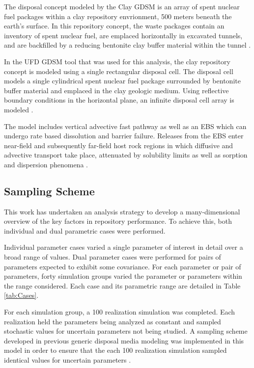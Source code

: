 The disposal concept modeled by the Clay \gls{GDSM} is an array of spent nuclear 
fuel packages within a clay repository envrionment, 500 meters beneath the 
earth's surface. In this repository concept, the waste packages contain an 
inventory of spent nuclear fuel, are emplaced horizontally in excavated tunnels, 
and are backfilled by a reducing bentonite clay buffer material within the 
tunnel \cite{nutt_generic_2009}. 

In the \gls{UFD} \gls{GDSM} tool that was used for this analysis, the clay 
repository concept is modeled using a single rectangular disposal cell. The 
disposal cell models a single cylindrical spent nuclear fuel package surrounded 
by bentonite buffer material and emplaced in the clay geologic medium. Using 
reflective boundary conditions in the horizontal plane, an infinite disposal 
cell array is modeled \cite{nutt_generic_2009}.

The model includes vertical advective fast pathway as well as an \gls{EBS} which 
can undergo rate based dissolution and barrier failure.  Releases from the 
\gls{EBS} enter near-field and subsequently far-field host rock regions in which 
diffusive and advective transport take place, attenuated by solubility limits as 
well as sorption and dispersion phenomena \cite{clayton_generic_2011}.

\subsection{Sampling Scheme}

This work has undertaken an analysis strategy to develop a many-dimensional 
overview of the key factors in repository performance. To achieve this, 
both individual and dual parametric cases were performed.

Individual parameter cases varied a single parameter of interest in 
detail over a broad range of values. Dual parameter cases were 
performed for pairs of parameters expected to exhibit some covariance. For 
each parameter or pair of parameters, forty simulation 
groups varied the parameter or parameters within the range considered. Each 
case and its parametric range are detailed in Table \ref{tab:Cases}. 



For each simulation group, a 100 realization simulation was completed. Each
realization held the parameters being analyzed as constant and sampled 
stochastic values for uncertain parameters not being studied.  A sampling scheme 
developed in previous generic disposal media modeling was implemented in this 
model in order to ensure that the each 100 realization simulation sampled 
identical values for uncertain parameters \cite{clayton_generic_2011, 
nutt_generic_2009}.  



